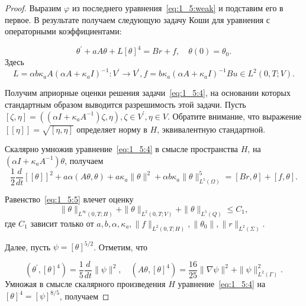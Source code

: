 \begin{proof}

    Выразим $\varphi$ из последнего уравнения~\eqref{eq:1_5:weak} и подставим его в первое.
    В результате получаем следующую задачу Коши для уравнения с операторными коэффициентами:

    \begin{equation}
        \label{eq:1_5:4}
        \theta^{\prime}+a A \theta+L[\theta]^{4}=B r+f, \quad \theta(0)=\theta_{0}.
    \end{equation}
    Здесь
    \[
        L=\alpha b \kappa_{a} A\left(\alpha A+\kappa_{a} I\right)^{-1}:
        V^{\prime} \rightarrow V^{\prime},
        f=b \kappa_{a}\left(\alpha A+\kappa_{a} I\right)^{-1} B u \in L^{2}(0, T ; V).
    \]

    Получим априорные оценки решения задачи~\eqref{eq:1_5:4},
    на основании которых стандартным образом выводится разрешимость этой задачи.
    Пусть $[\zeta, \eta]=\left(\left(\alpha I+\kappa_{a} A^{-1}\right) \zeta,
    \eta\right), \zeta \in V^{\prime}, \eta \in V$.
    Обратите внимание, что выражение $[[\eta]]=\sqrt{[\eta, \eta]}$
    определяет норму в $H$, эквивалентную стандартной.

    Скалярно умножив уравнение~\eqref{eq:1_5:4} в смысле пространства $H$,
    на $\left(\alpha I+\kappa_{a} A^{-1}\right) \theta$, получаем
    \begin{equation}
        \label{eq:1_5:5}
        \frac{1}{2} \frac{d}{d t}[[\theta]]^{2}+a \alpha(A \theta, \theta)
        +a \kappa_{a}\|\theta\|^{2}
        +\alpha b \kappa_{a}\|\theta\|_{L^{5}(\Omega)}^{5}=[B r, \theta]+[f, \theta].
    \end{equation}

    Равенство~\eqref{eq:1_5:5} влечет оценку
    \[
        \|\theta\|_{L^{\infty}(0, T ; H)}+\|\theta\|_{L^{2}(0, T ; V)}+\|\theta\|_{L^{5}(Q)} \leq C_{1},
    \]
    где $C_{1}$ зависит только от
    $a, b, \alpha, \kappa_{a},\|f\|_{L^{2}(0, T ; H)},\left\|\theta_{0}\right\|,\|r\|_{L^{2}(\Sigma)}$.

    Далее, пусть $\psi=[\theta]^{5 / 2}$.
    Отметим, что

    \[
        \left(\theta^{\prime},[\theta]^{4}\right)
        =\frac{1}{5} \frac{d}{d t}\|\psi\|^{2}, \quad\left(A \theta,[\theta]^{4}\right)
        =\frac{16}{25}\|\nabla \psi\|^{2}+\|\psi\|_{L^{2}(\Gamma)}^{2}.
    \]
    Умножая в смысле скалярного произведения $H$ уравнение~\eqref{eq:1_5:4}
    на $[\theta]^{4}=[\psi]^{8 / 5}$, получаем


\end{proof}

